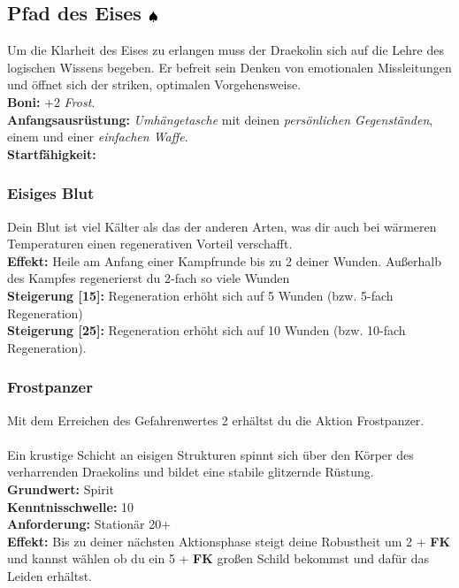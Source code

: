 \subsection*{Pfad des Eises ${\color{blue} }{\color{black}\spadesuit}$} 
Um die Klarheit des Eises zu erlangen muss der Draekolin sich auf die Lehre des logischen Wissens begeben. Er befreit sein Denken von emotionalen Missleitungen und öffnet sich der striken, optimalen Vorgehensweise. \\
\textbf{Boni:} +2 \textit{ Frost}. \\
\textbf{Anfangsausrüstung:} \textit{Umhängetasche} mit deinen \textit{persönlichen Gegenständen}, einem \textit{} und einer \textit{einfachen Waffe}.\\
\textbf{Startfähigkeit:} \\

\subsubsection*{ Eisiges Blut} \label{sk:eisiges_blut}
Dein Blut ist viel Kälter als das der anderen Arten, was dir auch bei wärmeren Temperaturen einen regenerativen Vorteil verschafft.\\
\textbf{Effekt:} Heile am Anfang einer Kampfrunde bis zu 2 deiner Wunden. Außerhalb des Kampfes regenerierst du 2-fach so viele Wunden\\
\textbf{Steigerung [15]:} Regeneration erhöht sich auf 5 Wunden (bzw. 5-fach Regeneration) \\
\textbf{Steigerung [25]:} Regeneration erhöht sich auf 10 Wunden (bzw. 10-fach Regeneration).

\subsubsection*{ Frostpanzer} \label{sk:frostpanzer}
Mit dem Erreichen des Gefahrenwertes 2 erhältst du die Aktion Frostpanzer.\\
\\
Ein krustige Schicht an eisigen Strukturen spinnt sich über den Körper des verharrenden Draekolins und bildet eine stabile glitzernde Rüstung.\\
\textbf{Grundwert:} Spirit \\
\textbf{Kenntnisschwelle:} 10 \\
\textbf{Anforderung:} Stationär 20+ \\
\textbf{Effekt:} Bis zu deiner nächsten Aktionsphase steigt deine Robustheit um 2 + \textbf{FK} und kannst wählen ob du ein 5 + \textbf{FK} großen Schild bekommst und dafür das Leiden  erhältst.

